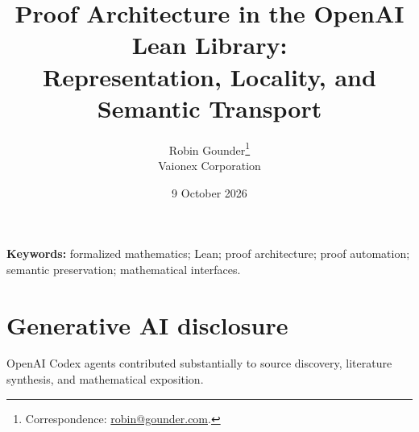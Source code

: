 \documentclass[11pt]{article}
\title{Proof Architecture in the OpenAI Lean Library:\\Representation, Locality, and Semantic Transport}
\author{Robin Gounder\thanks{Correspondence: \href{mailto:robin@gounder.com}{robin@gounder.com}.}\\{\small Vaionex Corporation}}
\date{9 October 2026}
\begin{document}
\maketitle

\noindent\textbf{Keywords:} formalized mathematics; Lean; proof architecture; proof automation; semantic preservation; mathematical interfaces.






\section*{Generative AI disclosure}
OpenAI Codex agents contributed substantially to source discovery, literature synthesis, and mathematical exposition.
\begingroup
\setlength{\bibsep}{4pt}


\endgroup
\end{document}
